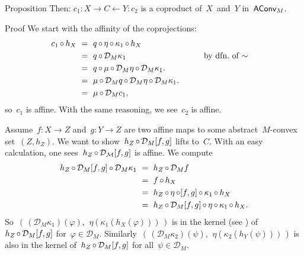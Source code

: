\documentclass[b]{subfiles}
\begin{document}
\begin{parsec}
\begin{point}{Proposition}
Then: $c_1 \colon X \to C \leftarrow Y \colon c_2$
is a coproduct of~$X$~and~$Y$ in~$\mathsf{AConv}_M$.
\begin{point}{Proof}%
We start with the affinity of the coprojections:
\begin{alignat*}{2}
    c_1 \after h_X & \ = \ 
    q \after \eta \after \kappa_1 \after h_X \\
    &\ =\  q \after \mathcal{D}_M \kappa_1
        &\qquad& \text{by dfn.~of~$\sim$}
    \\
    & \ =\  q \after \mu \after \mathcal{D}_M \eta \after \mathcal{D}_M \kappa_1. \\
    & \ =\  \mu \after \mathcal{D}_Mq \after \mathcal{D}_M \eta \after \mathcal{D}_M \kappa_1. \\
    & \ =\  \mu \after \mathcal{D}_M c_1,
\end{alignat*}
so~$c_1$ is affine. With the same reasoning, we see~$c_2$ is affine.
\begin{point}%
Assume~$f\colon X \to Z$ and~$g\colon Y \to Z$
    are two affine maps to some abstract~$M$-convex set~$(Z,h_Z)$.
We want to show~$h_Z \mathop{\circ} \mathcal{D}_M [f,g]$
    lifts to~$C$.
With an easy calculation,
    one sees~$h_Z \mathop{\circ} \mathcal{D_M} [f,g]$ is affine.
We compute
\begin{align*}
    h_Z \after \mathcal{D}_M [f,g] \after \mathcal{D}_M \kappa_1
     & \ = \ 
    h_Z \after \mathcal{D}_M f \\
     & \ = \ f \after h_X \\
     & \ = \ h_Z \after \eta \after [f,g] \after \kappa_1 \after h_X \\
     & \ = \ h_Z \after \mathcal{D}_M [f,g] \after \eta \after \kappa_1 \after h_X.
\end{align*}
So~$
(\,(\mathcal{D}_M \kappa_1) (\varphi), \,
\ \eta(\kappa_1 ( h_X (\varphi)))\,)$
is in the kernel (see )
of~$h_Z \mathop{\circ} \mathcal{D}_M [f,g]$
for~$\varphi \in \mathcal{D}_M$.
Similarly~$(\,(\mathcal{D}_M \kappa_2) (\psi), \,
\ \eta(\kappa_2 ( h_Y (\psi)))\,)$
is also in the kernel of~$h_Z \mathop{\circ} \mathcal{D}_M [f,g]$
for all~$\psi \in \mathcal{D}_M$.


\end{point}
\end{point}
\end{point}
\end{parsec}
\end{document}
